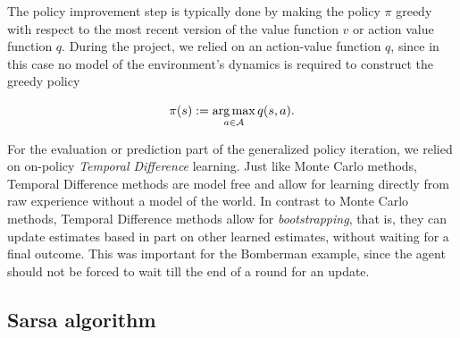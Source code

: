 The policy improvement step is typically done by making the policy $\pi$ greedy with respect to the most recent version of the value function $v$ or action value function $q$. During the project, we relied on an action-value function $q$, since in this case no model of the environment's dynamics is required to construct the greedy policy 

\begin{equation} \label{eq:greedy_policy_update}
	\pi(s) := \operatorname*{arg\,max}_{a \in \mathcal{A}} q(s, a).
\end{equation}

For the evaluation or prediction part of the generalized policy iteration, we relied on on-policy \emph{Temporal Difference} learning. Just like Monte Carlo methods, Temporal Difference methods are model free and allow for learning directly from raw experience without a model of the world. In contrast to Monte Carlo methods, Temporal Difference methods allow for \emph{bootstrapping}, that is, they can update estimates based in part on other learned estimates, without waiting for a final outcome. This was important for the Bomberman example, since the agent should not be forced to wait till the end of a round for an update.

\subsection{Sarsa algorithm}

